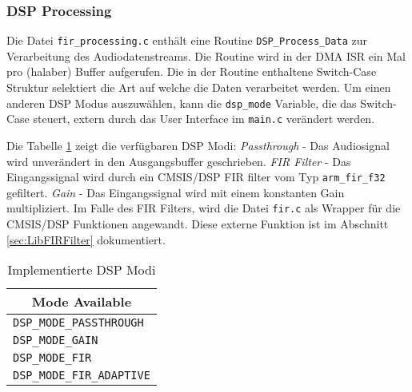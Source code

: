 \subsubsection{DSP Processing}
\label{sec:LibDSPProcessing}

Die Datei \texttt{fir\_processing.c} enthält eine Routine \texttt{DSP\_Process\_Data} zur Verarbeitung des Audiodatenstreams. Die Routine wird in der DMA ISR ein Mal pro (halaber) Buffer aufgerufen.
Die in der Routine enthaltene Switch-Case Struktur selektiert die Art auf welche die Daten verarbeitet werden. 
Um einen anderen DSP Modus auszuwählen, kann die \texttt{dsp\_mode} Variable, die das Switch-Case steuert, extern durch das User Interface im \texttt{main.c} verändert werden.

Die Tabelle \ref{tab:DSP_Modes} zeigt die verfügbaren DSP Modi: \textit{Passthrough} - Das Audiosignal wird unverändert in den Ausgangsbuffer geschrieben. \textit{FIR Filter} - Das Eingangssignal wird durch ein CMSIS/DSP FIR filter vom Typ \texttt{arm\_fir\_f32} gefiltert. \textit{Gain} - Das Eingangssignal wird mit einem konstanten Gain multipliziert.
Im Falle des FIR Filters, wird die Datei \texttt{fir.c} als Wrapper für die CMSIS/DSP Funktionen angewandt. Diese externe Funktion ist im Abschnitt \ref{sec:LibFIRFilter} dokumentiert.

\begin{table}[H]
	\centering
	\begin{tabular}{|l|}
		\hline
		\multicolumn{1}{|c|}{\textbf{Mode Available}} \\ \hline
		\texttt{DSP\_MODE\_PASSTHROUGH}                        \\ \hline
		\texttt{DSP\_MODE\_GAIN}                               \\ \hline
		\texttt{DSP\_MODE\_FIR}                                \\ \hline
		\texttt{DSP\_MODE\_FIR\_ADAPTIVE}                      \\ \hline
	\end{tabular}
	\caption{Implementierte DSP Modi}
	\label{tab:DSP_Modes}
\end{table}


